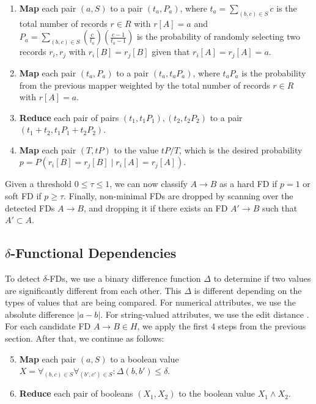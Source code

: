 \documentclass{article}
\begin{document}
\begin{enumerate}
        \item \textbf{Map} each pair $(a, S)$ to a pair $(t_a, P_a)$, where $t_a = \sum_{(b,c) \in S} c$ is the total number of records $r \in R$ with $r[A] = a$ and $P_a = \sum_{(b, c) \in S}(\frac{c}{t_a})(\frac{c-1}{t_a-1})$ is the probability of randomly selecting two records $r_i, r_j$ with $r_i[B] = r_j[B]$ given that $r_i[A] = r_j[A] = a$.
        
        \item \textbf{Map} each pair $(t_a, P_a)$ to a pair $(t_a, t_aP_a)$, where $t_aP_a$ is the probability from the previous mapper weighted by the total number of records $r \in R$ with $r[A] = a$.
        
        \item \textbf{Reduce} each pair of pairs $(t_1, t_1P_1), (t_2, t_2P_2)$ to a pair $(t_1 + t_2, t_1P_1 + t_2P_2)$.
        
        \item \textbf{Map} each pair $(T, tP)$ to the value $tP / T$, which is the desired probability $p = P(r_i[B] = r_j[B] \;|\; r_i[A] = r_j[A])$.
    \end{enumerate}
    
    \noindent Given a threshold $0 \leq \tau \leq 1$, we can now classify $A \rightarrow B$ as a hard FD if $p = 1$ or soft FD if $p \geq \tau$. Finally, non-minimal FDs are dropped by scanning over the detected FDs $A \rightarrow B$, and dropping it if there exists an FD $A' \rightarrow B$ such that $A' \subset A$.

    \subsection{\texorpdfstring{$\delta$}{delta}-Functional Dependencies}
    
    To detect $\delta$-FDs, we use a binary difference function $\Delta$ to determine if two values are significantly different from each other. This $\Delta$ is different depending on the types of values that are being compared. For numerical attributes, we use the absolute difference $|a - b|$. For string-valued attributes, we use the edit distance \cite{edit_dist}. For each candidate FD $A \rightarrow B \in H$, we apply the first 4 steps from the previous section. After that, we continue as follows:
    
    \begin{enumerate}
        \setcounter{enumi}{4}
        \item \textbf{Map} each pair $(a, S)$ to a boolean value $X = \forall_{(b,c) \in S} \forall_{(b', c') \in S} : \Delta(b, b') \leq \delta$.
        \item \textbf{Reduce} each pair of booleans $(X_1, X_2)$ to the boolean value $X_1 \wedge X_2$.
    \end{enumerate}
\end{document}
